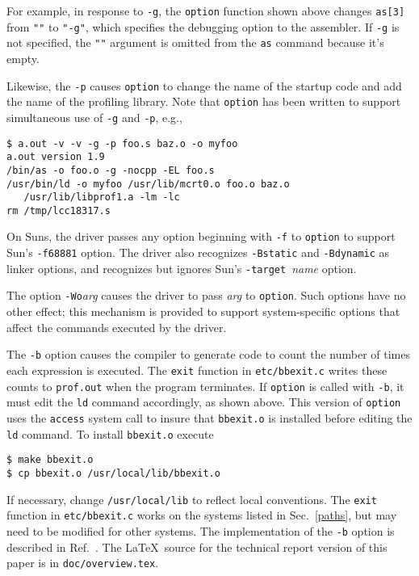 For example, in response to \verb|-g|, the \verb|option| function shown above
changes \verb|as[3]| from \verb|""| to \verb|"-g"|, which specifies
the debugging option to the assembler. If \verb|-g| is not specified,
the \verb|""| argument is omitted from the \verb|as| command
because it's empty.

Likewise, the \verb|-p| causes \verb|option| to change the name
of the startup code and add the name of the profiling library. Note that
\verb|option| has been written to support simultaneous use
of \verb|-g| and \verb|-p|, e.g.,
\begin{verbatim}
$ a.out -v -v -g -p foo.s baz.o -o myfoo
a.out version 1.9
/bin/as -o foo.o -g -nocpp -EL foo.s
/usr/bin/ld -o myfoo /usr/lib/mcrt0.o foo.o baz.o
   /usr/lib/libprof1.a -lm -lc
rm /tmp/lcc18317.s
\end{verbatim}

On Suns, the driver
passes any option beginning with \verb|-f| to \verb|option|
to support Sun's \verb|-f68881| option. The driver also
recognizes \verb|-Bstatic| and \verb|-Bdynamic| as linker options,
and recognizes but ignores Sun's \verb|-target|~{\it name\/} option.

The option \verb|-Wo|{\it arg\/} causes the driver to pass {\it arg\/}
to \verb|option|. Such options have no other effect; this mechanism
is provided to support system-specific options that affect the
commands executed by the driver.

The \verb|-b| option causes the compiler to generate
code to count the number of times each expression is executed.
The \verb|exit| function in \verb|etc/bbexit.c| writes these
counts to \verb|prof.out| when the program terminates.
If \verb|option| is called with \verb|-b|,
it must edit the \verb|ld| command accordingly,
as shown above. This version of \verb|option| uses
the \verb|access| system call to insure that \verb|bbexit.o| is installed before
editing the \verb|ld| command. To install \verb|bbexit.o| execute
\begin{verbatim}
$ make bbexit.o
$ cp bbexit.o /usr/local/lib/bbexit.o
\end{verbatim}
If necessary, change \verb|/usr/local/lib| to reflect local conventions.
The \verb|exit| function in \verb|etc/bbexit.c| works on the
systems listed in Sec.~\ref{paths}, but may need to be modified for other systems.
The implementation of the \verb|-b| option is described
in Ref.~\cite{fraser:hanson:91b}.
The \LaTeX\ source for the technical report version of this paper
is in \verb|doc/overview.tex|.

